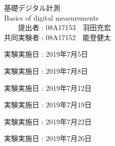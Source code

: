 \documentclass[11pt, a4paper,twocolumn]{jarticle}
\begin{document}
\begin{titlepage}
  \begin{center}
    {\Huge 基礎デジタル計測}\\
    \vspace{10truept}
    {\Huge Basics of digital measurements}\\
    \vspace{30truept}
    {\huge 　　提出者 : 08A17153　羽田充宏}\\ %
    {\huge 共同実験者 : 08A17152　能登健太}\\ %
    \vspace{50truept}

    \begin{list}{}{\setlength{\leftmargin}{95pt}}
    \item {\huge 実験実施日 : 2019年7月5日}\\
    \vspace{10truept}
    \item {\huge 実験実施日 : 2019年7月8日}\\
    \vspace{10truept}
    \item {\huge 実験実施日 : 2019年7月12日}\\
    \vspace{10truept}
    \item {\huge 実験実施日 : 2019年7月19日}\\
    \vspace{10truept}
    \item {\huge 実験実施日 : 2019年7月22日}\\
    \vspace{10truept}
    \item {\huge 実験実施日 : 2019年7月26日}\\
    \vspace{40truept}

    \end{list}
    \vspace{50truept}

  \end{center}
\end{titlepage}
\end{document}
